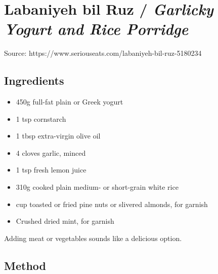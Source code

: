 \clearpage
\section{Labaniyeh bil Ruz / \emph{Garlicky Yogurt and Rice Porridge}}


Source: https://www.seriouseats.com/labaniyeh-bil-ruz-5180234

\subsection{Ingredients}

\begin{itemize}
    \item 450g full-fat plain or Greek yogurt 
    \item 1 tsp cornstarch
    \item 1 tbsp extra-virgin olive oil
    \item 4 cloves garlic, minced
    \item 1 tsp fresh lemon juice
    \item 310g cooked plain medium- or short-grain white rice
    \item {} cup toasted or fried pine nuts or slivered almonds, for garnish
    \item Crushed dried mint, for garnish
\end{itemize}

Adding meat or vegetables sounds like a delicious option.

\subsection{Method}

